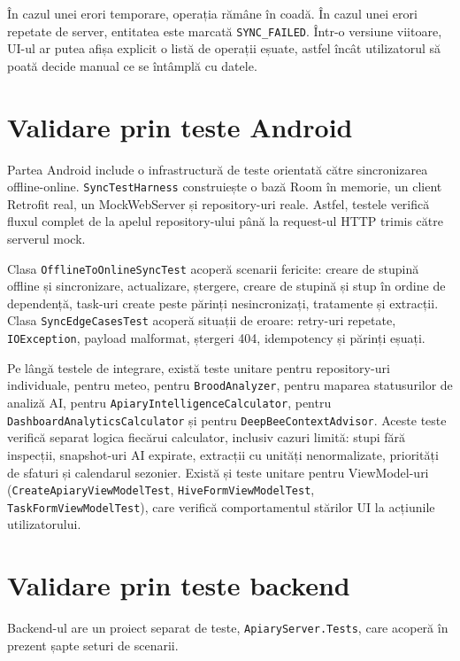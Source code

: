 În cazul unei erori temporare, operația rămâne în coadă. În cazul unei erori repetate de server, entitatea este marcată \texttt{SYNC\_FAILED}. Într-o versiune viitoare, UI-ul ar putea afișa explicit o listă de operații eșuate, astfel încât utilizatorul să poată decide manual ce se întâmplă cu datele.

\section{Validare prin teste Android}

Partea Android include o infrastructură de teste orientată către sincronizarea offline-online. \texttt{SyncTestHarness} construiește o bază Room în memorie, un client Retrofit real, un MockWebServer și repository-uri reale. Astfel, testele verifică fluxul complet de la apelul repository-ului până la request-ul HTTP trimis către serverul mock.

Clasa \texttt{OfflineToOnlineSyncTest} acoperă scenarii fericite: creare de stupină offline și sincronizare, actualizare, ștergere, creare de stupină și stup în ordine de dependență, task-uri create peste părinți nesincronizați, tratamente și extracții. Clasa \texttt{SyncEdgeCasesTest} acoperă situații de eroare: retry-uri repetate, \texttt{IOException}, payload malformat, ștergeri 404, idempotency și părinți eșuați.

Pe lângă testele de integrare, există teste unitare pentru repository-uri individuale, pentru meteo, pentru \texttt{BroodAnalyzer}, pentru maparea statusurilor de analiză AI, pentru \texttt{ApiaryIntelligenceCalculator}, pentru \texttt{DashboardAnalyticsCalculator} și pentru \texttt{DeepBeeContextAdvisor}. Aceste teste verifică separat logica fiecărui calculator, inclusiv cazuri limită: stupi fără inspecții, snapshot-uri AI expirate, extracții cu unități nenormalizate, priorități de sfaturi și calendarul sezonier. Există și teste unitare pentru ViewModel-uri (\texttt{CreateApiaryViewModelTest}, \texttt{HiveFormViewModelTest}, \texttt{TaskFormViewModelTest}), care verifică comportamentul stărilor UI la acțiunile utilizatorului.

\section{Validare prin teste backend}

Backend-ul are un proiect separat de teste, \texttt{ApiaryServer.Tests}, care acoperă în prezent șapte seturi de scenarii.

